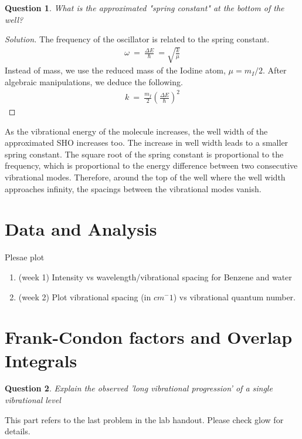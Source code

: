 \documentclass[10pt]{article}
\numberwithin{equation}{section}
\newtheorem{question}{Question}
\numberwithin{theorem}{section}
\numberwithin{proposition}{section}
\numberwithin{lemma}{section}
\numberwithin{corollary}{section}
\numberwithin{remark}{section}
\numberwithin{definition}{section}
\numberwithin{example}{section}
\numberwithin{conjecture}{section}
\numberwithin{question}{section}
\begin{document}
\begin{question}
    What is the approximated "spring constant" at the bottom of the well?
\end{question}
\begin{proof}[Solution]
    The frequency of the oscillator is related to the spring constant. 
    \begin{align}
        \omega \ = \ \frac{\Delta E} \hbar \ = \sqrt{\frac k \mu}
    \end{align}
    Instead of mass, we use the reduced mass of the Iodine atom, 
    $\mu = m_I/2$. After algebraic manipulations, we deduce the following. 
    \begin{align}
        k \ = \ \frac {m_I} 2 \left(
            \frac {\Delta E}{\hbar}
        \right)^2
    \end{align}
\end{proof}

As the vibrational energy of the molecule increases, the well width of 
the approximated SHO increases too. The increase in well width leads 
to a smaller spring constant. The square root of the spring constant 
is proportional to the frequency, which is proportional to the energy 
difference between two consecutive vibrational modes. Therefore, around 
the top of the well where the well width approaches infinity, the spacings 
between the vibrational modes vanish. 


\section{Data and Analysis}
Plesae plot 
\begin{enumerate}
\item (week 1) Intensity vs wavelength/vibrational spacing for Benzene and water  
\item (week 2) Plot vibrational spacing (in $cm^-1$) vs vibrational quantum number. 
\end{enumerate}

\section{Frank-Condon factors and Overlap Integrals}

\begin{question}
Explain the observed 'long vibrational progression' of a single vibrational level
\end{question}


This part refers to the last problem in the lab handout. Please check glow for details. 
\end{document}
